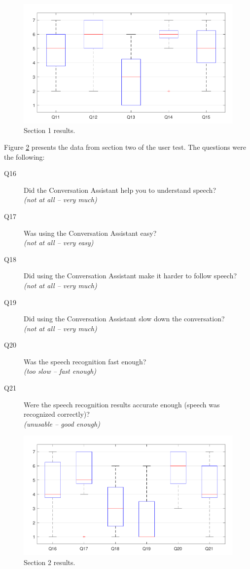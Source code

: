 \documentclass[english, 12pt, a4paper, pdftex, elec, utf8]{aaltothesis}
\begin{document}
\begin{figure}[h!]
	\centering
	\includegraphics[width=\textwidth]{T2_box2.pdf}
	\caption{Section 1 results.}
	\label{fig:results2} 
\end{figure}
Figure \ref{fig:results3} presents the data from section two of the user test. The questions were the following:
\begin{description}
	\item[Q16] Did the Conversation Assistant help you to understand speech? \\ \textit{(not at all -- very much)}
	\item[Q17] Was using the Conversation Assistant easy? \\ \textit{(not at all -- very easy)}
	\item[Q18] Did using the Conversation Assistant make it harder to follow speech? \\ \textit{(not at all -- very much)}
	\item[Q19] Did using the Conversation Assistant slow down the conversation? \\ \textit{(not at all  -- very much)}
	\item[Q20] Was the speech recognition fast enough? \\ \textit{(too slow -- fast enough)}
	\item[Q21] Were the speech recognition results accurate enough (speech was recognized correctly)? \\ \textit{(unusable -- good enough)}
\end{description}
\begin{figure}[h!]
	\centering
	\includegraphics[width=\textwidth]{T2_box3.pdf}
	\caption{Section 2 results.}
	\label{fig:results3} 
\end{figure}
\end{document}
